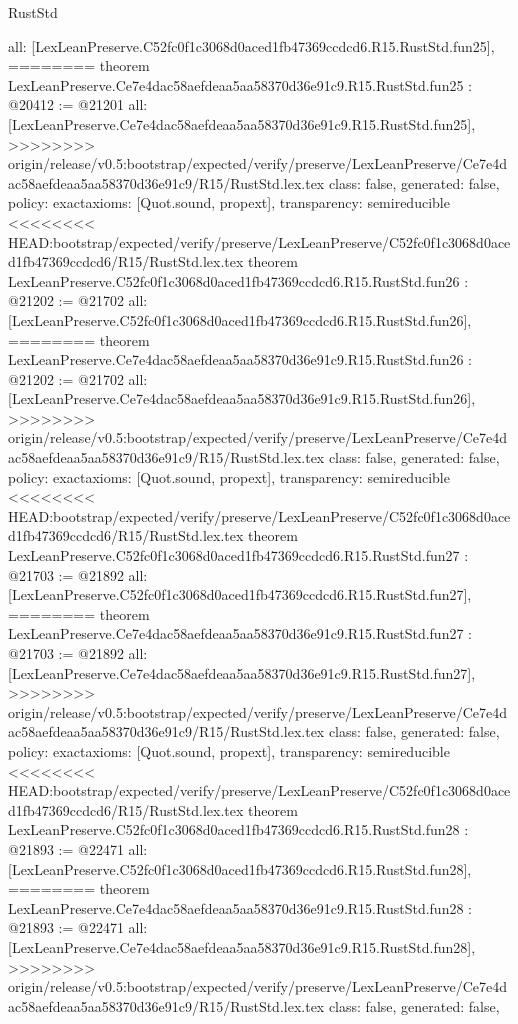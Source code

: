 \begin{lexlean}{RustStd}
\begin{coremodule}
{\begin{coremodule}
{{{{{{{{{{{{{{{{{{{{{{{{{{{{  all: [LexLeanPreserve.C52fc0f1c3068d0aced1fb47369ccdcd6.R15.RustStd.fun25],
========
theorem LexLeanPreserve.Ce7e4dac58aefdeaa5aa58370d36e91c9.R15.RustStd.fun25 : @20412 := @21201 {
  all: [LexLeanPreserve.Ce7e4dac58aefdeaa5aa58370d36e91c9.R15.RustStd.fun25],
>>>>>>>> origin/release/v0.5:bootstrap/expected/verify/preserve/LexLeanPreserve/Ce7e4dac58aefdeaa5aa58370d36e91c9/R15/RustStd.lex.tex
  class: false,
  generated: false,
  policy: exact{axioms: [Quot.sound, propext]},
  transparency: semireducible
}
<<<<<<<< HEAD:bootstrap/expected/verify/preserve/LexLeanPreserve/C52fc0f1c3068d0aced1fb47369ccdcd6/R15/RustStd.lex.tex
theorem LexLeanPreserve.C52fc0f1c3068d0aced1fb47369ccdcd6.R15.RustStd.fun26 : @21202 := @21702 {
  all: [LexLeanPreserve.C52fc0f1c3068d0aced1fb47369ccdcd6.R15.RustStd.fun26],
========
theorem LexLeanPreserve.Ce7e4dac58aefdeaa5aa58370d36e91c9.R15.RustStd.fun26 : @21202 := @21702 {
  all: [LexLeanPreserve.Ce7e4dac58aefdeaa5aa58370d36e91c9.R15.RustStd.fun26],
>>>>>>>> origin/release/v0.5:bootstrap/expected/verify/preserve/LexLeanPreserve/Ce7e4dac58aefdeaa5aa58370d36e91c9/R15/RustStd.lex.tex
  class: false,
  generated: false,
  policy: exact{axioms: [Quot.sound, propext]},
  transparency: semireducible
}
<<<<<<<< HEAD:bootstrap/expected/verify/preserve/LexLeanPreserve/C52fc0f1c3068d0aced1fb47369ccdcd6/R15/RustStd.lex.tex
theorem LexLeanPreserve.C52fc0f1c3068d0aced1fb47369ccdcd6.R15.RustStd.fun27 : @21703 := @21892 {
  all: [LexLeanPreserve.C52fc0f1c3068d0aced1fb47369ccdcd6.R15.RustStd.fun27],
========
theorem LexLeanPreserve.Ce7e4dac58aefdeaa5aa58370d36e91c9.R15.RustStd.fun27 : @21703 := @21892 {
  all: [LexLeanPreserve.Ce7e4dac58aefdeaa5aa58370d36e91c9.R15.RustStd.fun27],
>>>>>>>> origin/release/v0.5:bootstrap/expected/verify/preserve/LexLeanPreserve/Ce7e4dac58aefdeaa5aa58370d36e91c9/R15/RustStd.lex.tex
  class: false,
  generated: false,
  policy: exact{axioms: [Quot.sound, propext]},
  transparency: semireducible
}
<<<<<<<< HEAD:bootstrap/expected/verify/preserve/LexLeanPreserve/C52fc0f1c3068d0aced1fb47369ccdcd6/R15/RustStd.lex.tex
theorem LexLeanPreserve.C52fc0f1c3068d0aced1fb47369ccdcd6.R15.RustStd.fun28 : @21893 := @22471 {
  all: [LexLeanPreserve.C52fc0f1c3068d0aced1fb47369ccdcd6.R15.RustStd.fun28],
========
theorem LexLeanPreserve.Ce7e4dac58aefdeaa5aa58370d36e91c9.R15.RustStd.fun28 : @21893 := @22471 {
  all: [LexLeanPreserve.Ce7e4dac58aefdeaa5aa58370d36e91c9.R15.RustStd.fun28],
>>>>>>>> origin/release/v0.5:bootstrap/expected/verify/preserve/LexLeanPreserve/Ce7e4dac58aefdeaa5aa58370d36e91c9/R15/RustStd.lex.tex
  class: false,
  generated: false,
}}}}}}}}}}}}}}}}}}}}}}}}}}}}}}}}
\end{coremodule}}
\end{coremodule}
\end{lexlean}
